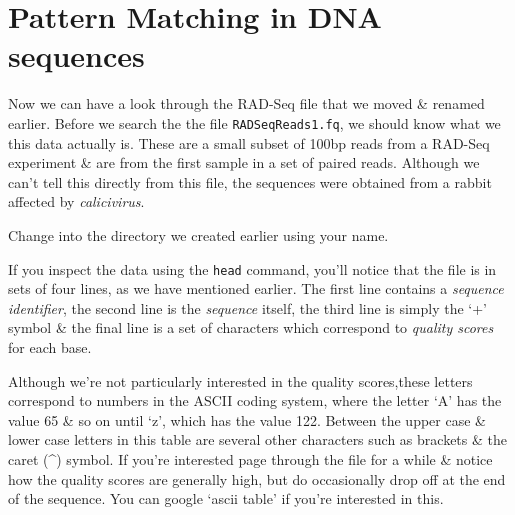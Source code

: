\documentclass[a4paper,12pt,twoside]{memoir}
\begin{document}
\section{Pattern Matching in DNA sequences}
Now we can have a look through the RAD-Seq file that we moved \& renamed earlier.
Before we search the the file \texttt{RADSeqReads1.fq}, we should know what we this data actually is.
These are a small subset of 100bp reads from a RAD-Seq experiment \& are from the first sample in a set of paired reads.
Although we can't tell this directly from this file, the sequences were obtained from a rabbit affected by \textit{calicivirus}.
\begin{steps}
Change into the directory we created earlier using your name.
\end{steps}

\begin{steps}
If you inspect the data using the \texttt{head} command, you'll notice that the file is in sets of four lines, as we have mentioned earlier.
The first line contains a \textit{sequence identifier}, the second line is the \textit{sequence} itself, the third line is simply the `+' symbol \& the final line is a set of characters which correspond to \textit{quality scores} for each base.
\end{steps}

\begin{bonus}
Although we're not particularly interested in the quality scores,these letters correspond to numbers in the ASCII coding system, where the letter `A' has the value 65 \& so on until `z', which has the value 122.
Between the upper case \& lower case letters in this table are several other characters such as brackets \& the caret (\^{}) symbol.
If you're interested page through the file for a while \& notice how the quality scores are generally high, but do occasionally drop off at the end of the sequence.
You can google `ascii table' if you're interested in this.
\end{bonus}
\end{document}
